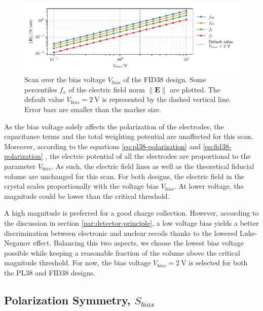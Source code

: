 \begin{figure}
\centering
\includegraphics[scale=1]{Figures/ElectrodesScan/capacitance_fiducial_V_bias.pdf}
\caption{Scan over the bias voltage $V_{bias}$ of the FID38 design. Some percentiles $f_x$ of the electric field norm $\| \mathbf{E} \|$ are plotted. The default value $V_{bias}=\SI{2}{\volt}$ is represented by the dashed vertical line. Error bars are smaller than the marker size.}
\label{fig:capacitance-fiducial-V-bias}
\end{figure}

As the bias voltage solely affects the polarization of the electrodes, the capacitance terms and the total weighting potential are unaffected for this scan. Moreover, according to the equations \ref{eq:pl38-polarization} and \ref{eq:fid38-polarization} , the electric potential of all the electrodes are proportional to the parameter $V_{bias}$. As such, the electric field lines as well as the theoretical fiducial volume are unchanged for this scan. 
For both designs, the electric field in the crystal scales proportionally with the voltage bias $V_{bias}$. At lower voltage, the magnitude could be lower than the critical threshold.

A high magnitude is preferred for a good charge collection. However, according to the discussion in section \ref{par:detector-principle}, a low voltage bias yields a better discrimination between electronic and nuclear recoils thanks to the lowered Luke-Neganov effect. Balancing this two aspects, we choose the lowest bias voltage possible while keeping a reasonable fraction of the volume above the critical magnitude threshold. For now, the bias voltage $V_{bias} = \SI{2}{\volt}$ is selected for both the PL38 and FID38 designs.


\subsection{Polarization Symmetry, $S_{bias}$}

